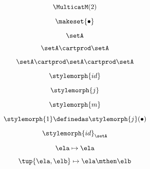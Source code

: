\begin{forslides}
    \begin{equation}
        \label{eq:slides_multicategories_35}
        \MulticatM(2)
    \end{equation}

    \begin{equation}
        \label{eq:slides_multicategories_36}
        \makeset{ \bullet }
    \end{equation}

    \begin{equation}
        \label{eq:slides_multicategories_37}
        \setA
    \end{equation}

    \begin{equation}
        \label{eq:slides_multicategories_38}
        \setA \cartprod \setA
    \end{equation}

    \begin{equation}
        \label{eq:slides_multicategories_39}
        \setA \cartprod \setA \cartprod \setA
    \end{equation}

    \begin{equation}
        \label{eq:slides_multicategories_40}
        \stylemorph{id}
    \end{equation}

    \begin{equation}
        \label{eq:slides_multicategories_41}
        \stylemorph{j}
    \end{equation}

    \begin{equation}
        \label{eq:slides_multicategories_42}
        \stylemorph{m}
    \end{equation}

    \begin{equation}
        \label{eq:slides_multicategories_43}
        \stylemorph{1} \definedas \stylemorph{j}(\bullet)
    \end{equation}

    \begin{equation}
        \label{eq:slides_multicategories_44}
        \stylemorph{id}_{\setA}
    \end{equation}

    \begin{equation}
        \label{eq:slides_multicategories_45}
        \ela \mapsto \ela
    \end{equation}

    \begin{equation}
        \label{eq:slides_multicategories_46}
        \tup{\ela, \elb} \mapsto \ela \mthen \elb
    \end{equation}


\end{forslides}
